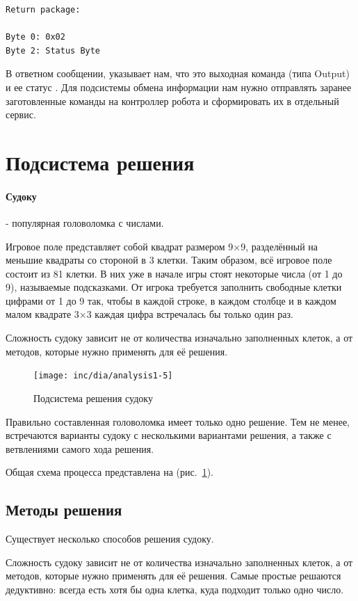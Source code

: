 \begin{lstlisting}[caption=Формат команды ответа]
Return package:

Byte 0: 0x02
Byte 2: Status Byte
\end{lstlisting}
В ответном сообщении,  указывает нам, что это выходная команда (типа Output) и ее статус .
Для подсистемы обмена информации нам нужно отправлять заранее заготовленные команды на контроллер робота и сформировать их в отдельный сервис.

\section{Подсистема решения}

\paragraph{Судоку} - популярная головоломка с числами.

Игровое поле представляет собой квадрат размером 9×9, разделённый на меньшие квадраты со стороной в 3 клетки. Таким образом, всё игровое поле состоит из 81 клетки. В них уже в начале игры стоят некоторые числа (от 1 до 9), называемые подсказками. От игрока требуется заполнить свободные клетки цифрами от 1 до 9 так, чтобы в каждой строке, в каждом столбце и в каждом малом квадрате 3×3 каждая цифра встречалась бы только один раз.

Сложность судоку зависит не от количества изначально заполненных клеток, а от методов, которые нужно применять для её решения.

\begin{figure}[ht]
	\centering
	\texttt{[image: inc/dia/analysis1-5]}
	\caption{Подсистема решения судоку}
  \label{fig:fig05}
\end{figure}

Правильно составленная головоломка имеет только одно решение. Тем не менее, встречаются варианты судоку с несколькими вариантами решения, а также с ветвлениями самого хода решения.

Общая схема процесса представлена на (рис.~\ref{fig:fig05}).

\subsection{Методы решения}
Существует несколько способов решения судоку.

Сложность судоку зависит не от количества изначально заполненных клеток, а от методов, которые нужно применять для её решения. Самые простые решаются дедуктивно: всегда есть хотя бы одна клетка, куда подходит только одно число. 

